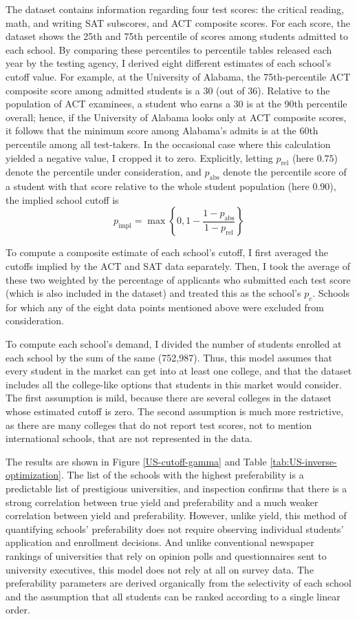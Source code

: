\documentclass[12pt]{article}
\theoremstyle{definition}
\begin{document}
The dataset contains information regarding four test scores: the critical reading, math, and writing SAT subscores, and ACT composite scores. For each score, the dataset shows the 25th and 75th percentile of scores among students admitted to each school. By comparing these percentiles to percentile tables released each year by the testing agency, I derived eight different estimates of each school's cutoff value. For example, at the University of Alabama, the 75th-percentile ACT composite score among admitted students is a 30 (out of 36). Relative to the population of ACT examinees, a student who earns a 30 is at the 90th percentile overall; hence, if the University of Alabama looks only at ACT composite scores, it follows that the minimum score among Alabama's admits is at the 60th percentile among all test-takers. In the occasional case where this calculation yielded a negative value, I cropped it to zero. Explicitly, letting $p_{\text{rel}}$ (here $0.75$) denote the percentile under consideration, and $p_{\text{abs}}$ denote the percentile score of a student with that score relative to the whole student population (here $0.90$), the implied school cutoff is \[p_{\text{impl}} = \max\left\{0, 1 - \frac{1 - p_{\text{abs}}}{1- p_{\text{rel}}}\right\}\]

To compute a composite estimate of each school's cutoff, I first averaged the cutoffs implied by the ACT and SAT data separately. Then, I took the average of these two weighted by the percentage of applicants who submitted each test score (which is also included in the dataset) and treated this as the school's $p_c$. Schools for which any of the eight data points mentioned above were excluded from consideration.

To compute each school's demand, I divided the number of students enrolled at each school by the sum of the same (752,987). Thus, this model assumes that every student in the market can get into at least one college, and that the dataset includes all the college-like options that students in this market would consider. The first assumption is mild, because there are several colleges in the dataset whose estimated cutoff is zero. The second assumption is much more restrictive, as there are many colleges that do not report test scores, not to mention international schools, that are not represented in the data.

The results are shown in Figure \ref{US-cutoff-gamma} and Table \ref{tab:US-inverse-optimization}. The list of the schools with the highest preferability is a predictable list of prestigious universities, and inspection confirms that there is a strong correlation between true yield and preferability and a much weaker correlation between yield and preferability. However, unlike yield, this method of quantifying schools' preferability does not require observing individual students' application and enrollment decisions. And unlike conventional newspaper rankings of universities that rely on opinion polls and questionnaires sent to university executives, this model does not rely at all on survey data. The preferability parameters are derived organically from the selectivity of each school and the assumption that all students can be ranked according to a single linear order.
\end{document}
